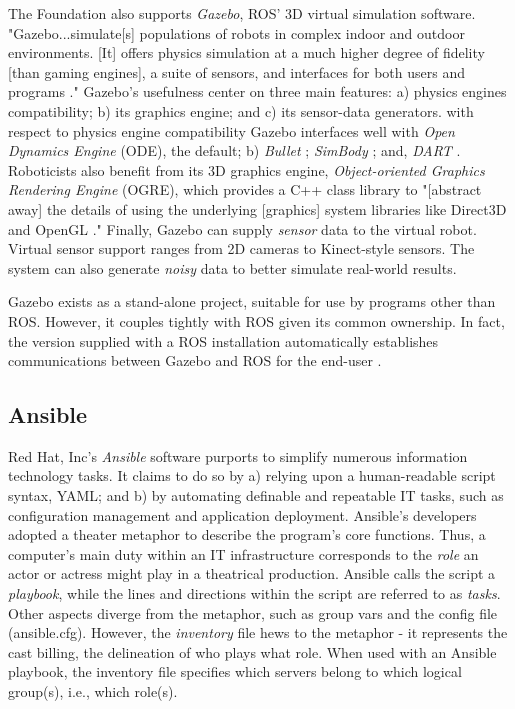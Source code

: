 \documentclass[9pt,twocolumn,twoside]{../../styles/osajnl}
\begin{document}
The Foundation also supports \textit{Gazebo}, ROS' 3D virtual simulation software.  "Gazebo...simulate[s] populations of robots in complex indoor and outdoor environments. [It] offers physics simulation at a much higher degree of fidelity [than gaming engines], a suite of sensors, and interfaces for both users and programs \cite{www-gazebo-overview}."  Gazebo's usefulness center on three main features: a) physics engines compatibility; b) its graphics engine; and c) its sensor-data generators.  with respect to physics engine compatibility Gazebo interfaces well with \textit{Open Dynamics Engine} \cite{www-ode-homepage} (ODE), the default; b) \textit{Bullet} \cite{www-bullet-homepage}; \textit{SimBody} \cite{www-simbody-homepage}; and, \textit{DART} \cite{www-dart-homepage}. Roboticists also benefit from its 3D graphics engine, \textit{Object-oriented Graphics Rendering Engine} \cite{www-ogre-homepage} (OGRE), which provides a C++ class library to "[abstract away] the details of using the underlying [graphics] system libraries like Direct3D and OpenGL \cite{www-ogre-about}."  Finally, Gazebo can supply \textit{sensor} data to the virtual robot.  Virtual sensor support ranges from 2D cameras to Kinect-style sensors.  The system can also generate \textit{noisy} data to better simulate real-world results.

Gazebo exists as a stand-alone project, suitable for use by programs other than ROS.  However, it couples tightly with ROS given its common ownership.  In fact, the version supplied with a ROS installation automatically establishes communications between Gazebo and ROS for the end-user \cite{www-gazebo-ros}.  

\subsection{Ansible}

Red Hat, Inc's \cite{www-redhat} \textit{Ansible} software purports to simplify numerous information technology tasks.  It claims to do so by a) relying upon a human-readable script syntax, YAML; and b) by automating definable and repeatable IT tasks, such as configuration management and application deployment.  Ansible's developers adopted a theater metaphor to describe the program's core functions.  Thus, a computer's main duty within an IT infrastructure corresponds to the \textit{role} an actor or actress might play in a theatrical production.  Ansible calls the script a \textit{playbook}, while the lines and directions within the script are referred to as \textit{tasks}.  Other aspects diverge from the metaphor, such as group vars and the config file (ansible.cfg).  However, the \textit{inventory} file hews to the metaphor - it represents the cast billing, the delineation of who plays what role.  When used with an Ansible playbook, the inventory file specifies which servers belong to which logical group(s), i.e., which role(s). 
\end{document}
